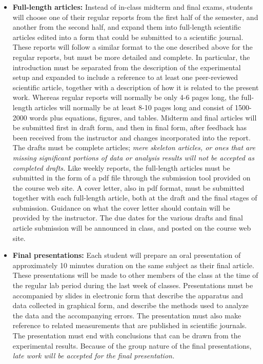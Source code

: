 \documentclass{revtex4}
\begin{document}
\begin{itemize}
\item
{\bf Full-length articles:} Instead of in-class midterm and final exams,
students will choose one of their regular reports from the first half of the
semester, and another from the second half, and expand them into full-length
scientific articles edited into a form that could be submitted to a scientific
journal. These reports will follow a similar format to the one described above
for the regular reports, but must be more detailed and complete. In particular, 
the introduction must be separated from the description of the experimental
setup and expanded to include a reference to at least one peer-reviewed 
scientific article, together with a description of how it is related to the
present work. Whereas regular reports will normally be only 4-6 pages long,
the full-length articles will normally be at least 8-10 pages long and consist
of 1500-2000 words plus equations, figures, and tables. Midterm and final 
articles will be submitted first in draft form, and then in final form,
after feedback has been received from the instructor and changes incorporated
into the report. The drafts must be complete articles; {\it mere skeleton
articles, or ones that are missing significant portions of data or analysis
results will not be accepted as completed drafts.} Like weekly reports, the
full-length articles must be submitted in the form of a pdf file through the
submission tool provided on the course web site.
A cover letter, also in pdf format, must be submitted
together with each full-length article, both at the draft and the final stages
of submission. Guidance on what the cover letter should contain will be 
provided by the instructor. The due dates for the various drafts and final
article submission will be announced in class, and posted on the course web
site.

\item
{\bf Final presentations:} Each student will prepare an oral presentation of
approximately 10 minutes duration on the same subject as their final article.
These presentations will be made to other members of the class at the time
of the regular lab period during the last week of classes. Presentations must
be accompanied by slides in electronic form that describe the apparatus and
data collected in graphical form, and describe the methods used to analyze the
data and the accompanying errors. The presentation must also make reference
to related measurements that are published in scientific journals. The
presentation must end with conclusions that can be drawn from the experimental
results. Because of the group nature of the final presentations, {\it late 
work will be accepted for the final presentation.}
\end{itemize}
\end{document}
